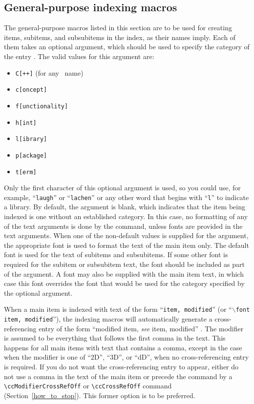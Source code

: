\documentclass[11pt]{article}
\begin{document}
\subsection{General-purpose indexing macros}%
\label{generic_macros}

The general-purpose macros listed in this section are to be used for 
creating items, subitems, and subsubitems in the index, as their names imply. 
Each of them takes an optional argument, which should be used to
specify the category of the entry
.  The valid values for this argument are:
\begin{itemize}
   \item {\tt C[++]} (for any \CC\ name)
   \item {\tt c[oncept]} 
   \item {\tt f[unctionality]} 
   \item {\tt h[int]} 
   \item {\tt l[ibrary]} 
   \item {\tt p[ackage]} 
   \item {\tt t[erm]} 
\end{itemize}
Only the first character of this optional argument is used, so you could
use, for example, ``{\tt laugh}'' or ``{\tt lachen}'' or any other word that 
begins with ``{\tt l}'' to indicate a library.
By default, the argument is blank, which indicates that the
item being indexed is one without an established category.  In this
case, no formatting of any of the text arguments is done by the command,
unless fonts are provided in the text arguments.
When one of the non-default values is supplied for the argument, the
appropriate font is used to format the text
of the main item only.  The default font is used for the 
text of subitems
and subsubitems.  If some other font is required for 
the subitem or subsubitem
text, the font should be included as part of the argument.  A font may also
be supplied with the main item text, in which case this 
font overrides
the font that would be used for the category specified by the optional argument.

When a main item is indexed with text of the form ``{\tt item, modified}''
(or ``{\tt $\backslash$font item, modified}''),
the indexing macros will automatically generate a cross-referencing
entry of the form ``modified item, {\em see} item, modified''%
. 
The modifier is assumed to be everything that follows the first comma in
the text. This happens for all main items with text that contains a 
comma, except in the case when the modifier is one 
of ``2D'', ``3D'', or ``dD'', when no cross-referencing entry is 
required.  If you do not want the 
cross-referencing entry to appear, 
either do not use a comma in the text of the main item or precede
the command by a \verb|\ccModifierCrossRefOff| or \verb|\ccCrossRefOff|
command 
(Section~\ref{how_to_stop}).  This former option is to be preferred.
\end{document}
